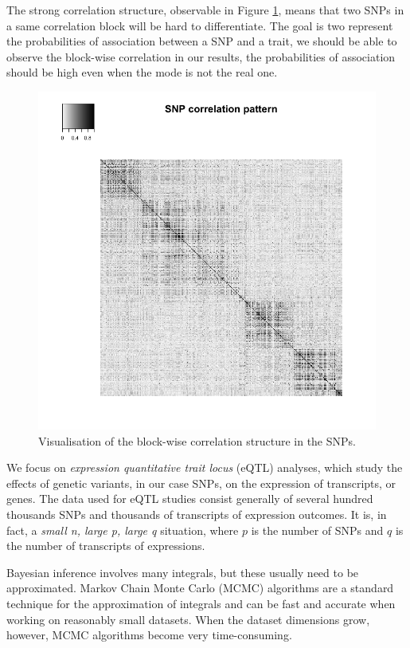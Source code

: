\documentclass[a4paper, 11pt]{report}
\numberwithin{equation}{chapter}
\begin{document}
The strong correlation structure, observable in Figure \ref{fig:corr}, means that two SNPs in a same correlation block will be hard to differentiate. The goal is two represent the probabilities of association between a SNP and a trait, we should be able to observe the block-wise correlation in our results, the probabilities of association should be high even when the mode is not the real one.

\begin{figure}[h!]
\begin{center}
\includegraphics[width=5in,bb = 0 0 800px 800px]{images/corr_real_SNPs.png}
\caption{\label{fig:corr} Visualisation of the block-wise correlation structure in the SNPs.}
\end{center}
\end{figure}

We focus on \textit{expression quantitative trait locus} (eQTL) analyses, which study the effects of genetic variants, in our case SNPs, on the expression of transcripts, or genes. The data used for eQTL studies consist generally of several hundred thousands SNPs and thousands of transcripts of expression outcomes. It is, in fact, a \textit{small n, large p, large q} situation, where $p$ is the number of SNPs and $q$ is the number of transcripts of expressions.

Bayesian inference involves many integrals, but these usually need to be approximated. Markov Chain Monte Carlo (MCMC) algorithms are a standard technique for the approximation of integrals and can be fast and accurate when working on reasonably small datasets. When the dataset dimensions grow, however, MCMC algorithms become very time-consuming.
\end{document}
